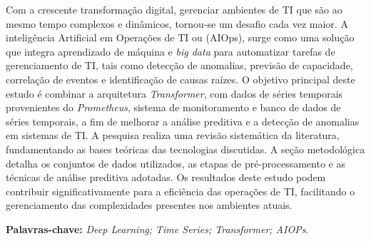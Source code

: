 \begin{resumo}

Com a crescente transformação digital, gerenciar ambientes de TI que são ao mesmo tempo complexos e dinâmicos, tornou-se um desafio cada vez maior. A inteligência Artificial em Operações de TI ou (AIOps), surge como uma solução que integra aprendizado de máquina e \textit{big data} para automatizar tarefas de gerenciamento de TI, tais como detecção de anomalias, previsão de capacidade, correlação de eventos e identificação de causas raízes. O objetivo principal deste estudo é combinar a arquitetura \textit{Transformer}, com dados de séries temporais provenientes do \textit{Prometheus}, sistema de monitoramento e banco de dados de séries temporais, a fim de melhorar a análise preditiva e a detecção de anomalias em sistemas de TI. A pesquisa realiza uma revisão sistemática da literatura, fundamentando as bases teóricas das tecnologias discutidas. A seção metodológica detalha os conjuntos de dados utilizados, as etapas de pré-processamento e as técnicas de análise preditiva adotadas. Os resultados deste estudo podem contribuir significativamente para a eficiência das operações de TI, facilitando o gerenciamento das complexidades presentes nos ambientes atuais.

\textbf{Palavras-chave:} \textit{Deep Learning; Time Series; Transformer; AIOPs}.

\end{resumo}
